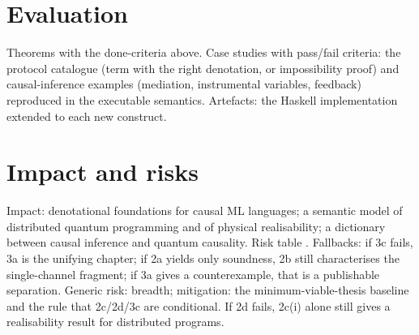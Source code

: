 \documentclass[11pt,a4paper]{article}
\newif\ifskeletonnotes
\newcommand{\sknote}[1]{\ifskeletonnotes{\small\color{blue!60!black}\textit{[#1]}}\fi}
\newcommand{\skfill}[1]{\ifskeletonnotes{\color{orange!80!black}[FILL: #1]}\fi}
\begin{document}
\section{Evaluation}\sknote{(v); $\frac14$ page}
Theorems with the done-criteria above. Case studies with pass/fail criteria: the protocol catalogue (term with the right denotation, or impossibility proof) and causal-inference examples (mediation, instrumental variables, feedback) reproduced in the executable semantics. Artefacts: the Haskell implementation extended to each new construct. \sknote{Do not list peer review as evaluation; venues go under dissemination in the plan.}

\section{Impact and risks}\sknote{(vi); $\frac12$ page}
Impact: denotational foundations for causal ML languages; a semantic model of distributed quantum programming and of physical realisability; a dictionary between causal inference and quantum causality. Risk table \skfill{one row per item: rating, fallback}. Fallbacks: if 3c fails, 3a is the unifying chapter; if 2a yields only soundness, 2b still characterises the single-channel fragment; if 3a gives a counterexample, that is a publishable separation. Generic risk: breadth; mitigation: the minimum-viable-thesis baseline and the rule that 2c/2d/3c are conditional. If 2d fails, 2c(i) alone still gives a realisability result for distributed programs.
\end{document}
